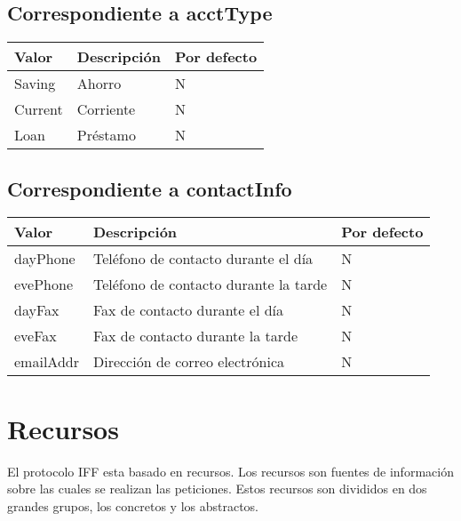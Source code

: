 \subsection{Correspondiente a acctType}
\begin{center}
\begin{tabular}{|>{\centering\arraybackslash}p{}|>{\centering\arraybackslash}p{}|>{\centering\arraybackslash}p{}|}
\hline 
\bfseries {Valor} & \bfseries {Descripción} & \bfseries {Por defecto} \\ 
\hline 
Saving & Ahorro & N \\ 
\hline 
Current & Corriente & N \\
\hline 
Loan & Préstamo & N \\
\hline
\end{tabular} 
\end{center}

\subsection{Correspondiente a contactInfo}
\begin{center}
\begin{tabular}{|>{\centering\arraybackslash}p{}|>{\centering\arraybackslash}p{}|>{\centering\arraybackslash}p{}|}
\hline 
\bfseries {Valor} & \bfseries {Descripción} & \bfseries {Por defecto} \\ 
\hline 
dayPhone & Teléfono de contacto durante el día & N \\
\hline 
evePhone & Teléfono de contacto durante la tarde & N \\
\hline 
dayFax & Fax de contacto durante el día & N \\
\hline
eveFax & Fax de contacto durante la tarde & N \\
\hline
emailAddr & Dirección de correo electrónica & N \\
\hline
\end{tabular} 
\end{center}
	
\section{Recursos}
El protocolo IFF esta basado en recursos. Los recursos son fuentes de información sobre las cuales se realizan las peticiones. Estos recursos son divididos en dos grandes grupos, los concretos y los abstractos.

